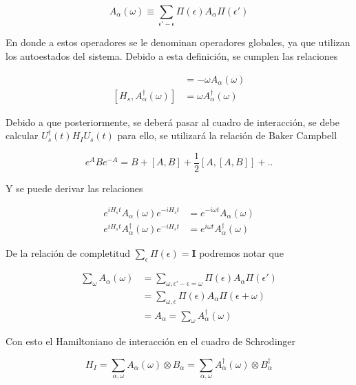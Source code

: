 \begin{equation*}
    A_{\alpha}(\omega) \equiv \sum_{\epsilon' - \epsilon}\Pi(\epsilon)A_{\alpha}\Pi(\epsilon') 
\end{equation*}

En donde a estos operadores se le denominan operadores globales, ya que utilizan los autoestados del sistema. Debido a esta definición, se cumplen las relaciones

\begin{align*}
    [H_{s},A_{\alpha}(\omega)] & = - \omega A_{\alpha}(\omega) \\
    [H_{s},A^{\dagger}_{\alpha}(\omega)] & = \omega A^{\dagger}_{\alpha}(\omega)
\end{align*}

Debido a que posteriormente, se deberá pasar al cuadro de interacción, se debe calcular $U^{\dagger}_{s}(t)H_{I}U_{s}(t)$ para ello, se utilizará la relación de Baker Campbell

\begin{equation}
    e^{A}Be^{-A} = B  + [A,B] + \frac{1}{2}[A,[A,B]] +..
    \label{sec2lind:baker}
\end{equation}

Y se puede derivar las relaciones 

\begin{align*}
    e^{iH_{s}t}A_{\alpha}(\omega) e^{-iH_{s}t} & = e^{-i\omega t} A_{\alpha}(\omega) \\
    e^{iH_{s}t}A^{\dagger}_{\alpha}(\omega) e^{-iH_{s}t} & = e^{i\omega t} A^{\dagger}_{\alpha}(\omega)
\end{align*}

De la relación de completitud $\sum_{\epsilon}\Pi(\epsilon) = \mathbf{I}$ podremos notar que

\begin{align*}
   \sum_{\omega}A_{\alpha}(\omega) & =  \sum_{\omega,\epsilon'-\epsilon  = \omega} \Pi(\epsilon) A_{\alpha} \Pi(\epsilon') \\
   & = \sum_{\omega,\epsilon} \Pi(\epsilon) A_{\alpha} \Pi(\epsilon + \omega) \\
   & = A_{\alpha} = \sum_{\omega}A^{\dagger}_{\alpha}(\omega)
\end{align*}

Con esto el Hamiltoniano de interacción en el cuadro de Schrodinger

\begin{equation*}
    H_{I} = \sum_{\alpha,\omega}A_{\alpha}(\omega) \otimes B_{\alpha} = \sum_{\alpha,\omega}A^{\dagger}_{\alpha}(\omega) \otimes B^{\dagger}_{\alpha}
\end{equation*}

